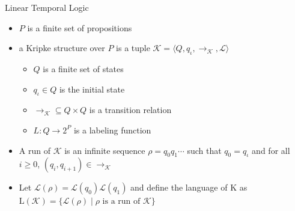\documentclass[12pt]{beamer}
\begin{document}
\begin{frame}{Linear Temporal Logic}
	\begin{itemize}
		\item $P$ is a finite set of propositions
		\item a Kripke structure over
$P$ is a tuple $\mathcal{K} = \langle Q, q_{\iota}, \rightarrow_{\mathcal{K}}, \mathcal{L} \rangle$
		\begin{itemize}
			\item $Q$ is a finite set of states	
			\item $q_{\iota} \in Q$ is the initial state
			\item $\rightarrow_{\mathcal{K}} \subseteq Q \times Q$ is a transition relation
			\item $L : Q \to 2^{P}$ is a labeling function
		\end{itemize}
		\item A run of $\mathcal{K}$ is an infinite sequence $\rho = q_{0}q_{1}\cdots$ such that $q_{0} = q_{\iota}$ and for all $i \geq 0$, $(q_{i}, q_{i+1}) \in \rightarrow_{\mathcal{K}}$
		\item Let $\mathcal{L}(\rho) = \mathcal{L}(q_{0})\mathcal{L}(q_{1})$ and define the language of K as $\text{L}(\mathcal{K}) =
\{\mathcal{L}(\rho) \mid \rho \text{ is a run of } \mathcal{K}\}$
	\end{itemize}
\end{frame}
\end{document}
